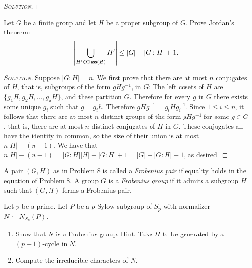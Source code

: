 \begin{proof}[{\scshape Solution}]

\end{proof}

\newpage

\begin{problem}
Let $G$ be a finite group and let $H$ be a proper subgroup of $G$. Prove Jordan's theorem:
\[
  \left\lvert \bigcup_{H' \in \mathsf{Class}(H)} H' \right\rvert \leq \lvert G \rvert - \lvert G:H\rvert +1.
\]
\end{problem}


\begin{proof}[{\scshape Solution}]
Suppose $\lvert G : H \rvert = n$. We first prove that there are at most $n$ conjugates of $H$, that is, subgroups of the form $gHg^{-1}$, in $G$: The left cosets of $H$ are $\{g_1H, g_2H, \ldots, g_nH\}$, and these partition $G$. Therefore for every $g$ in $G$ there exists some unique $g_i$ such that $g = g_ih$. Therefore $gHg^{-1} = g_iHg_i^{-1}$. Since $1 \leq i \leq n$, it follows that there are at most $n$ distinct groups of the form $gHg^{-1}$ for some $g \in G$, that is, there are at most $n$ distinct conjugates of $H$ in $G$. These conjugates all have the identity in common, so the size of their union is at most $n\lvert H \rvert - (n-1)$. We have that $n\lvert H \rvert -(n-1) = \lvert G :H \rvert \lvert H\rvert - \lvert G :H \rvert + 1 = \lvert G \rvert - \lvert G :H \rvert + 1$, as desired.
\end{proof}

\newpage
  \noindent A pair $(G, H)$ as in Problem 8 is called a \emph{Frobenius pair} if equality holds in the equation of Problem 8. A group $G$ is a \emph{Frobenius group} if it admits a subgroup $H$ such that $(G, H)$ forms a Frobenius pair.

\begin{problem}
  Let $p$ be a prime. Let $P$ be a $p$-Sylow subgroup of $S_p$ with normalizer $N\coloneqq N_{S_p}(P)$.
  \begin{enumerate}[font=\normalfont,label=\textbf{(\Alph*)}]


    \item Show that $N$ is a Frobenius group. Hint: Take $H$ to be generated by a $(p-1)$-cycle in $N$.
    \item Compute the irreducible characters of $N$.

  \end{enumerate}
\end{problem}

